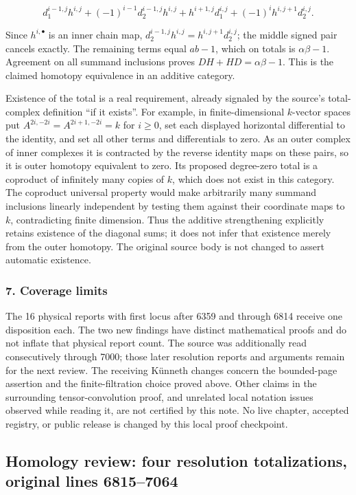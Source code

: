 \documentclass[11pt]{article}
\begin{document}
\[
d_1^{i-1,j}h^{i,j}
+(-1)^{i-1}d_2^{i-1,j}h^{i,j}
+h^{i+1,j}d_1^{i,j}
+(-1)^ih^{i,j+1}d_2^{i,j}.
\]

Since \(h^{i,\bullet}\) is an inner chain map, \(d_2^{i-1,j}h^{i,j}=h^{i,j+1}d_2^{i,j}\); the middle signed pair cancels exactly. The remaining terms equal \(ab-1\), which on totals is \(\alpha\beta-1\). Agreement on all summand inclusions proves \(DH+HD=\alpha\beta-1\). This is the claimed homotopy equivalence in an additive category.

Existence of the total is a real requirement, already signaled by the source's total-complex definition ``if it exists''. For example, in finite-dimensional \(k\)-vector spaces put \(A^{2i,-2i}=A^{2i+1,-2i}=k\) for \(i\geq0\), set each displayed horizontal differential to the identity, and set all other terms and differentials to zero. As an outer complex of inner complexes it is contracted by the reverse identity maps on these pairs, so it is outer homotopy equivalent to zero. Its proposed degree-zero total is a coproduct of infinitely many copies of \(k\), which does not exist in this category. The coproduct universal property would make arbitrarily many summand inclusions linearly independent by testing them against their coordinate maps to \(k\), contradicting finite dimension. Thus the additive strengthening explicitly retains existence of the diagonal sums; it does not infer that existence merely from the outer homotopy. The original source body is not changed to assert automatic existence.

\subsubsection{7. Coverage limits}\label{coverage-limits}

The 16 physical reports with first locus after 6359 and through 6814 receive one disposition each. The two new findings have distinct mathematical proofs and do not inflate that physical report count. The source was additionally read consecutively through 7000; those later resolution reports and arguments remain for the next review. The receiving Künneth changes concern the bounded-page assertion and the finite-filtration choice proved above. Other claims in the surrounding tensor-convolution proof, and unrelated local notation issues observed while reading it, are not certified by this note. No live chapter, accepted registry, or public release is changed by this local proof checkpoint.
\clearpage
\subsection{Homology review: four resolution totalizations, original lines 6815--7064}\label{homology-review-four-resolution-totalizations-original-lines-68157064}
\end{document}
